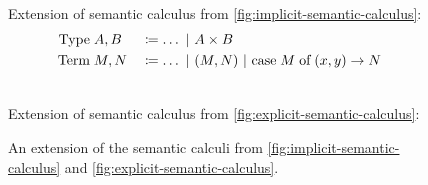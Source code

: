 \begin{figure}
  \begin{mdframed}
    \centering
    \vspace*{\baselineskip}
    Extension of semantic calculus from
    \autoref{fig:implicit-semantic-calculus}:
    \begin{alignat*}{4}
      \text{Type}\;&A,B&&\coloneqq\ldots\vsep A\times B\\
      \text{Term}\;&M,N&&\coloneqq\ldots\vsep (M, N)\vsep\case{M}{x}{y}{N}
    \end{alignat*}
    \begin{prooftree}
    \end{prooftree}
    \begin{prooftree}
    \end{prooftree}
    \hrulefill\\%
    \vspace*{\baselineskip}
    Extension of semantic calculus from
    \autoref{fig:explicit-semantic-calculus}:
    \begin{prooftree}
    \end{prooftree}
    \begin{prooftree}
    \end{prooftree}
    \vspace*{0.5\baselineskip}
  \end{mdframed}
  \caption{An extension of the semantic calculi from
    \autoref{fig:implicit-semantic-calculus} and
    \autoref{fig:explicit-semantic-calculus}.}
  \label{fig:extension-products}
\end{figure}
%
